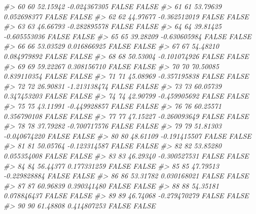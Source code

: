 \documentclass[
  oneside]{book}
\newenvironment{Shaded}{\begin{snugshade}}{\end{snugshade}}
\newcommand{\CommentTok}[1]{\textcolor[rgb]{0.56,0.35,0.01}{\textit{#1}}}
\begin{document}
\begin{Shaded}
\begin{Highlighting}[]
\CommentTok{\#\textgreater{} 60   60  52.15942 {-}0.024367305     FALSE       FALSE}
\CommentTok{\#\textgreater{} 61   61  53.79639  0.052698377     FALSE       FALSE}
\CommentTok{\#\textgreater{} 62   62  44.97677 {-}0.362512019     FALSE       FALSE}
\CommentTok{\#\textgreater{} 63   63  46.66793 {-}0.282895578     FALSE       FALSE}
\CommentTok{\#\textgreater{} 64   64  39.81425 {-}0.605553036     FALSE       FALSE}
\CommentTok{\#\textgreater{} 65   65  39.28209 {-}0.630605984     FALSE       FALSE}
\CommentTok{\#\textgreater{} 66   66  53.03529  0.016866925     FALSE       FALSE}
\CommentTok{\#\textgreater{} 67   67  54.48210  0.084979892     FALSE       FALSE}
\CommentTok{\#\textgreater{} 68   68  50.53004 {-}0.101074926     FALSE       FALSE}
\CommentTok{\#\textgreater{} 69   69  59.22267  0.308156710     FALSE       FALSE}
\CommentTok{\#\textgreater{} 70   70  70.50085  0.839110354     FALSE       FALSE}
\CommentTok{\#\textgreater{} 71   71  45.08969 {-}0.357195838     FALSE       FALSE}
\CommentTok{\#\textgreater{} 72   72  26.90831 {-}1.213138474     FALSE       FALSE}
\CommentTok{\#\textgreater{} 73   73  60.05739  0.347453203     FALSE       FALSE}
\CommentTok{\#\textgreater{} 74   74  42.90799 {-}0.459905692     FALSE       FALSE}
\CommentTok{\#\textgreater{} 75   75  43.11991 {-}0.449928857     FALSE       FALSE}
\CommentTok{\#\textgreater{} 76   76  60.25571  0.356790108     FALSE       FALSE}
\CommentTok{\#\textgreater{} 77   77  47.15227 {-}0.260093649     FALSE       FALSE}
\CommentTok{\#\textgreater{} 78   78  37.79282 {-}0.700717576     FALSE       FALSE}
\CommentTok{\#\textgreater{} 79   79  51.81303 {-}0.040674220     FALSE       FALSE}
\CommentTok{\#\textgreater{} 80   80  48.61109 {-}0.191415507     FALSE       FALSE}
\CommentTok{\#\textgreater{} 81   81  50.05764 {-}0.123314587     FALSE       FALSE}
\CommentTok{\#\textgreater{} 82   82  53.85280  0.055354008     FALSE       FALSE}
\CommentTok{\#\textgreater{} 83   83  46.29340 {-}0.300527531     FALSE       FALSE}
\CommentTok{\#\textgreater{} 84   84  56.44377  0.177331259     FALSE       FALSE}
\CommentTok{\#\textgreater{} 85   85  47.79513 {-}0.229828884     FALSE       FALSE}
\CommentTok{\#\textgreater{} 86   86  53.31782  0.030168021     FALSE       FALSE}
\CommentTok{\#\textgreater{} 87   87  60.96839  0.390341480     FALSE       FALSE}
\CommentTok{\#\textgreater{} 88   88  54.35181  0.078846437     FALSE       FALSE}
\CommentTok{\#\textgreater{} 89   89  46.74068 {-}0.279470279     FALSE       FALSE}
\CommentTok{\#\textgreater{} 90   90  61.48808  0.414807253     FALSE       FALSE}

\end{Highlighting}
\end{Shaded}
\end{document}
